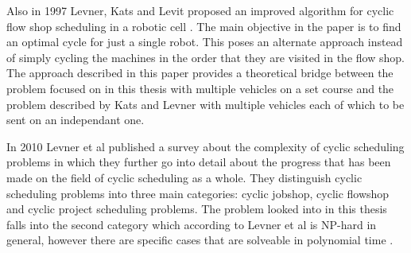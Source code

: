 Also in 1997 Levner, Kats and Levit proposed an improved algorithm for cyclic flow shop scheduling in a robotic cell \cite{levner1997}. The main objective in the paper is to find an optimal cycle for just a single robot. This poses an alternate approach instead of simply cycling the machines in the order that they are visited in the flow shop. The approach described in this paper provides a theoretical bridge between the problem focused on in this thesis with multiple vehicles on a set course and the problem described by Kats and Levner \cite{kats1997b} with multiple vehicles each of which to be sent on an independant one.

In 2010 Levner et al published a survey about the complexity of cyclic scheduling problems in which they further go into detail about the progress that has been made on the field of cyclic scheduling as a whole. They distinguish cyclic scheduling problems into three main categories: cyclic jobshop, cyclic flowshop and cyclic project scheduling problems. The problem looked into in this thesis falls into the second category which according to Levner et al is NP-hard in general, however there are specific cases that are solveable in polynomial time \cite{levner2010}.